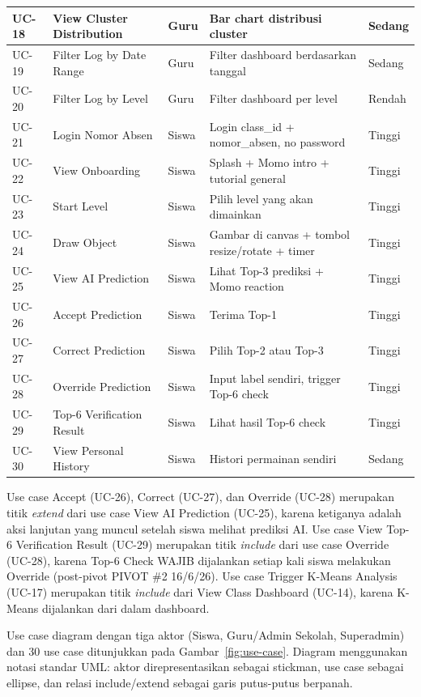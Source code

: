 \documentclass[12pt,a4paper,oneside,openany]{report}
\begin{document}
\begin{table}[H]
\begin{tabular}{|p{1cm}|p{3.8cm}|p{2.5cm}|p{5cm}|p{1.2cm}|}
UC-18 & View Cluster Distribution & Guru & Bar chart distribusi cluster & Sedang \\ \hline
UC-19 & Filter Log by Date Range & Guru & Filter dashboard berdasarkan tanggal & Sedang \\ \hline
UC-20 & Filter Log by Level & Guru & Filter dashboard per level & Rendah \\ \hline
UC-21 & Login Nomor Absen & Siswa & Login class\_id + nomor\_absen, no password & Tinggi \\ \hline
UC-22 & View Onboarding & Siswa & Splash + Momo intro + tutorial general & Tinggi \\ \hline
UC-23 & Start Level & Siswa & Pilih level yang akan dimainkan & Tinggi \\ \hline
UC-24 & Draw Object & Siswa & Gambar di canvas + tombol resize/rotate + timer & Tinggi \\ \hline
UC-25 & View AI Prediction & Siswa & Lihat Top-3 prediksi + Momo reaction & Tinggi \\ \hline
UC-26 & Accept Prediction & Siswa & Terima Top-1 & Tinggi \\ \hline
UC-27 & Correct Prediction & Siswa & Pilih Top-2 atau Top-3 & Tinggi \\ \hline
UC-28 & Override Prediction & Siswa & Input label sendiri, trigger Top-6 check & Tinggi \\ \hline
UC-29 & Top-6 Verification Result & Siswa & Lihat hasil Top-6 check & Tinggi \\ \hline
UC-30 & View Personal History & Siswa & Histori permainan sendiri & Sedang \\ \hline
\end{tabular}
\end{table}

Use case Accept (UC-26), Correct (UC-27), dan Override (UC-28) merupakan titik \textit{extend} dari use case View AI Prediction (UC-25), karena ketiganya adalah aksi lanjutan yang muncul setelah siswa melihat prediksi AI. Use case View Top-6 Verification Result (UC-29) merupakan titik \textit{include} dari use case Override (UC-28), karena Top-6 Check WAJIB dijalankan setiap kali siswa melakukan Override (post-pivot PIVOT \#2 16/6/26). Use case Trigger K-Means Analysis (UC-17) merupakan titik \textit{include} dari View Class Dashboard (UC-14), karena K-Means dijalankan dari dalam dashboard.

Use case diagram dengan tiga aktor (Siswa, Guru/Admin Sekolah, Superadmin) dan 30 use case ditunjukkan pada Gambar~\ref{fig:use-case}. Diagram menggunakan notasi standar UML: aktor direpresentasikan sebagai stickman, use case sebagai ellipse, dan relasi include/extend sebagai garis putus-putus berpanah.
\end{document}

